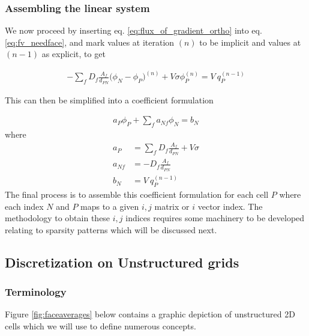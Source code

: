 \documentclass[11pt,letterpaper,titlepage]{article}
\newcommand{\beq}{\begin{equation*}
\begin{aligned}}
\newcommand{\eeq}{\end{aligned}
\end{equation*}}
\newcommand{\beqn}{\begin{equation}
	\begin{aligned}}
\newcommand{\eeqn}{\end{aligned}
	\end{equation}}
\numberwithin{equation}{section}
\begin{document}
\subsubsection{Assembling the linear system}
We now proceed by inserting eq. \eqref{eq:flux_of_gradient_ortho} into eq. \eqref{eq:fv_needface}, and mark values at iteration $(n)$ to be implicit and values at $(n-1)$ as explicit,  to get

\beqn
-\sum_fD_f\frac{A_f}{d_{PN}} 
\biggr(
\phi_N - \phi_P
\biggr)^{(n)}  + V \sigma \phi_P^{(n)} = V \ q_P^{(n-1)}
\eeqn 

\noindent 
This can then be simplified into a coefficient formulation

\beq 
a_P \phi_P + \sum_f a_{Nf} \phi_N = b_N
\eeq 
\newline 
where 
\beq 
a_P &= \sum_f D_f\frac{A_f}{d_{PN}}   + V \sigma \\
a_{Nf} &= -D_f\frac{A_f}{d_{PN}} \\
b_N &= V \ q_P^{(n-1)}
\eeq 
\newline 
\noindent 
The final process is to assemble this coefficient formulation for each cell $P$ where each index $N$ and $P$ maps to a given $i,j$ matrix or $i$ vector index. The methodology to obtain these $i,j$ indices requires some machinery to be developed relating to sparsity patterns which will be discussed next.


\newpage 
\subsection{Discretization on Unstructured grids}
\subsubsection{Terminology}

Figure \ref{fig:faceaverages} below contains a graphic depiction of unstructured 2D cells which we will use to define numerous concepts.
\end{document}
